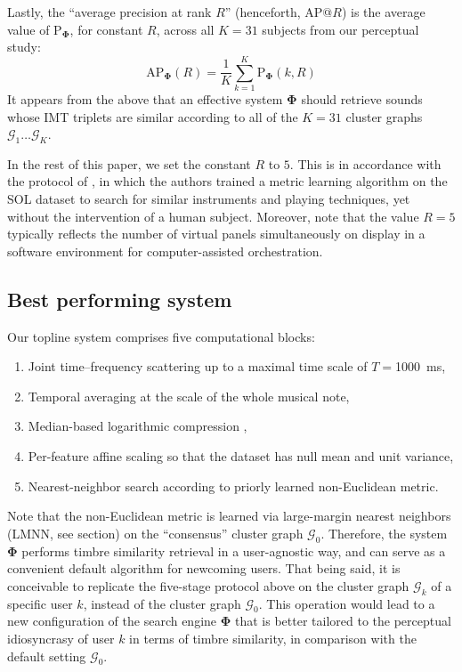 \documentclass{bmcart}
\newcommand{\lnameref}[1]{%
\bgroup
\let\nmu\MakeLowercase
\nameref{#1}\egroup}
\newcommand{\nmu}{}
\begin{document}
Lastly, the ``average precision at rank $R$'' (henceforth, AP@$R$) is the average value of $\mathrm{P}_{\mathbf{\Phi}}$, for constant $R$, across all $K=31$ subjects from our perceptual study:
\begin{equation}
\mathrm{AP}_{\mathbf{\Phi}}(R) =
\dfrac{1}{K}
\sum_{k=1}^{K}
\mathrm{P}_{\mathbf{\Phi}}(k, R)
\end{equation}
It appears from the above that an effective system $\mathbf{\Phi}$ should retrieve sounds whose IMT triplets are similar according to all of the $K=31$ cluster graphs $\mathcal{G}_1 \ldots \mathcal{G}_K$.

In the rest of this paper, we set the constant $R$ to $5$.
This is in accordance with the protocol of \cite{lostanlen2018extended}, in which the authors trained a metric learning algorithm on the SOL dataset to search for similar instruments and playing techniques, yet without the intervention of a human subject.
Moreover, note that the value $R=5$ typically reflects the number of virtual panels simultaneously on display in a software environment for computer-assisted orchestration.


\subsection*{Best performing system}
Our topline system comprises five computational blocks:
\begin{enumerate}
\item Joint time--frequency scattering up to a maximal time scale of $T=$\SI{1000}{\milli\second},
\item Temporal averaging at the scale of the whole musical note,
\item Median-based logarithmic compression \cite[Equation 1]{lostanlen2018extended},
\item Per-feature affine scaling so that the dataset has null mean and unit variance,
\item Nearest-neighbor search according to priorly learned non-Euclidean metric.
\end{enumerate}
Note that the non-Euclidean metric is learned via large-margin nearest neighbors (LMNN, see \lnameref{sec:methods} section) on the ``consensus'' cluster graph $\mathcal{G}_0$.
Therefore, the system $\mathbf{\Phi}$ performs timbre similarity retrieval in a user-agnostic way, and can serve as a convenient default algorithm for newcoming users.
That being said, it is conceivable to replicate the five-stage protocol above on the cluster graph $\mathcal{G}_k$ of a specific user $k$, instead of the cluster graph $\mathcal{G}_0$.
This operation would lead to a new configuration of the search engine $\mathbf{\Phi}$ that is better tailored to the perceptual idiosyncrasy of user $k$ in terms of timbre similarity, in comparison with the default setting $\mathcal{G}_0$.
\end{document}
